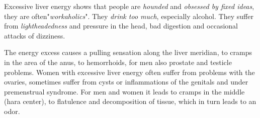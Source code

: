 \documentclass[../Book.Stress_regulation.tex]{subfiles}
\begin{document}
Excessive liver energy shows that people are \emph{hounded} and \emph{obsessed by fixed ideas}, they are often"\emph{workaholics}".
They \emph{drink too much}, especially alcohol. 
They suffer from \emph{lightheadedness} and pressure in the head, bad digestion and occasional attacks of dizziness.

The energy excess causes a pulling sensation along the liver meridian, to cramps in the area of the anus, to hemorrhoids, for men also prostate and testicle problems. Women with excessive liver energy often suffer from problems with the ovaries, sometimes suffer from cysts or inflammations of the genitals and under premenstrual syndrome.
For men and women it leads to cramps in the middle (hara center), to flatulence and decomposition of tissue, which in turn leads to an odor.
\end{document}
